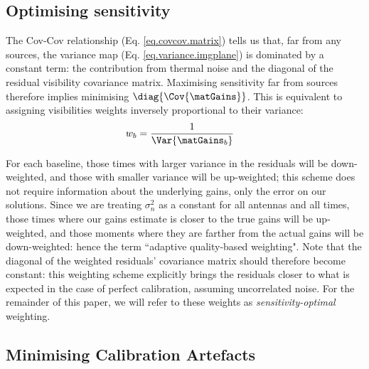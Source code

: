 \subsection{Optimising sensitivity}\label{sec.lightweights.formalism}


\pg
The Cov-Cov relationship (Eq. \ref{eq.covcov.matrix}) tells us that, far from any sources, the variance map (Eq. \ref{eq.variance.imgplane}) is dominated by a constant term: the contribution from thermal noise and the diagonal of the residual visibility covariance matrix. Maximising sensitivity far from sources therefore implies minimising $\diag{\Cov{\matGains}}$. This is equivalent to assigning visibilities weights inversely proportional to their variance:
\begin{align}
w_{b} &= \frac{1}{\Var{\matGains_{b}}}
\end{align}

\pg
For each baseline, those times with larger variance in the residuals will be down-weighted, and those with smaller variance will be up-weighted; this scheme does not require information about the underlying gains, only the error on our solutions. Since we are treating $\sigma_n^2$ as a constant for all antennas and all times, those times where our gains estimate is closer to the true gains will be up-weighted, and those moments where they are farther from the actual gains will be down-weighted: hence the term ``adaptive quality-based weighting". Note that the diagonal of the weighted residuals' covariance matrix should therefore become constant: this weighting scheme explicitly brings the residuals closer to what is expected in the case of perfect calibration, assuming uncorrelated noise. For the remainder of this paper, we will refer to these weights as \emph{sensitivity-optimal} weighting.



\subsection{Minimising Calibration Artefacts}\label{sec.fullweights.formalism}

